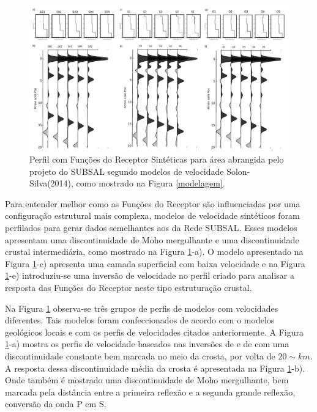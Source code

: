 \begin{figure}[!ht]
\centering
\includegraphics[scale=0.25]{Figs/perfil_RF_sintetico.png}
\caption{Perfil com Funções do Receptor Sintéticas para área abrangida pelo projeto do SUBSAL segundo modelos de velocidade Solon-Silva(2014), como mostrado na Figura \ref{modelagem}.}
\label{perfil_modelagem}
\end{figure}

Para entender melhor como as Funções do Receptor são influenciadas por uma configuração estrutural mais complexa, modelos de velocidade sintéticos foram perfilados para gerar dados semelhantes aos da Rede SUBSAL. Esses modelos apresentam uma discontinuidade de Moho mergulhante e uma discontinuidade crustal intermediária, como mostrado na Figura \ref{perfil_modelagem}-a). O modelo apresentado na Figura \ref{perfil_modelagem}-c) apresenta uma camada superficial com baixa velocidade  e na Figura \ref{perfil_modelagem}-e) introduziu-se uma inversão de velocidade no perfil criado para analisar a resposta das Funções do Receptor neste tipo estruturação crustal.

Na Figura \ref{perfil_modelagem} observa-se três grupos de perfis de modelos com velocidades diferentes. Tais modelos foram confeccionados de acordo com o modelos geológicos locais e com os perfis de velocidades citados anteriormente. A Figura \ref{perfil_modelagem}-a) mostra os perfis de velocidade baseados nas inversões de \cite{flora_solon_ancient_2013} e de \cite{Silva_2014} com uma discontinuidade constante bem marcada no meio da crosta, por volta de $20 \sim km$. A resposta dessa discontinuidade média da crosta é apresentada na Figura \ref{perfil_modelagem}-b). Onde também é mostrado uma discontinuidade de Moho mergulhante, bem marcada pela distância entre a primeira reflexão e a segunda grande reflexão, conversão da onda P em S.

